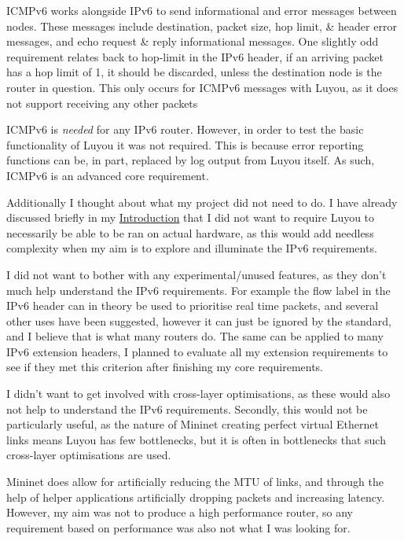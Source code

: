 \documentclass[12pt,a4paper,twoside,openright]{report}
\begin{document}
\bigskip

ICMPv6 works alongside IPv6 to send informational and error messages between nodes.  These messages include destination, packet size, hop limit, \& header error messages, and echo request \& reply informational messages. One slightly odd requirement relates back to hop-limit in the IPv6 header, if an arriving packet has a hop limit of 1, it should be discarded, unless the destination node is the router in question.  This only occurs for ICMPv6 messages with Luyou, as it does not support receiving any other packets

ICMPv6 is \textit{needed} for any IPv6 router.  However, in order to test the basic functionality of Luyou it was not required. This is because error reporting functions can be, in part, replaced by log output from Luyou itself. As such, ICMPv6 is an advanced core requirement.

\bigskip

Additionally I thought about what my project did not need to do. I have already discussed briefly in my \hyperref[chap::introduction]{Introduction} that I did not want to require Luyou to necessarily be able to be ran on actual hardware, as this would add needless complexity when my aim is to explore and illuminate the IPv6 requirements. 

I did not want to bother with any experimental/unused features, as they don't much help understand the IPv6 requirements. For example the flow label in the IPv6 header can in theory be used to prioritise real time packets, and several other uses have been suggested, however it can just be ignored by the standard, and I believe that is what many routers do.  The same can be applied to many IPv6 extension headers, I planned to evaluate all my extension requirements to see if they met this criterion after finishing my core requirements.

I didn't want to get involved with cross-layer optimisations, as these would also not help to understand the IPv6 requirements.  Secondly, this would not be particularly useful, as the nature of Mininet creating perfect virtual Ethernet links means Luyou has few bottlenecks, but it is often in bottlenecks that such cross-layer optimisations are used.

Mininet does allow for artificially reducing the MTU of links, and through the help of helper applications artificially dropping packets and increasing latency.  However, my aim was not to produce a high performance router, so any requirement based on performance was also not what I was looking for.
\end{document}

